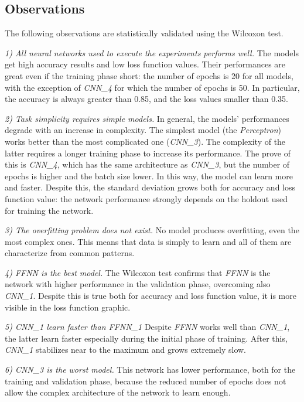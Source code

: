 \subsection{Observations}\label{header-n627}

The following observations are statistically validated using the
Wilcoxon test.

\emph{1) All neural networks used to execute the experiments performs
well.} The models get high accuracy results and low loss function
values. Their performances are great even if the training phase short:
the number of epochs is 20 for all models, with the exception of
\emph{CNN\_4} for which the number of epochs is 50. In particular, the
accuracy is always greater than 0.85, and the loss values smaller than
0.35.

\emph{2) Task simplicity requires simple models.} In general, the
models' performances degrade with an increase in complexity. The
simplest model (the \emph{Perceptron}) works better than the most
complicated one (\emph{CNN\_3}). The complexity of the latter requires a
longer training phase to increase its performance. The prove of this is
\emph{CNN\_4}, which has the same architecture as \emph{CNN\_3}, but the
number of epochs is higher and the batch size lower. In this way, the
model can learn more and faster. Despite this, the standard deviation
grows both for accuracy and loss function value: the network performance
strongly depends on the holdout used for training the network.

\emph{3) The overfitting problem does not exist.} No model produces
overfitting, even the most complex ones. This means that data is simply
to learn and all of them are characterize from common patterns.

\emph{4) FFNN is the best model.} The Wilcoxon test confirms that
\emph{FFNN} is the network with higher performance in the validation
phase, overcoming also \emph{CNN\_1}. Despite this is true both for
accuracy and loss function value, it is more visible in the loss
function graphic.

\emph{5) CNN\_1 learn faster than FFNN\_1} Despite \emph{FFNN} works well than \emph{CNN\_1}, the latter learn faster especially during the initial phase of training. After this, \emph{CNN\_1} stabilizes near to the maximum and grows extremely slow. 

\emph{6) CNN\_3 is the worst model.} This network has lower performance,
both for the training and validation phase, because the reduced number
of epochs does not allow the complex architecture of the network to
learn enough.

